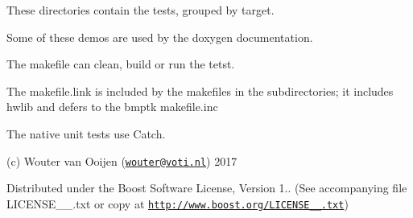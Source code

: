 These directories contain the tests, grouped by target.

Some of these demos are used by the doxygen documentation.

The makefile can clean, build or run the tetst.

The makefile.\+link is included by the makefiles in the subdirectories; it includes hwlib and defers to the bmptk makefile.\+inc

The native unit tests use Catch.

(c) Wouter van Ooijen (\href{mailto:wouter@voti.nl}{\tt wouter@voti.\+nl}) 2017

Distributed under the Boost Software License, Version 1.. (See accompanying file L\+I\+C\+E\+N\+S\+E\+\_\+\_.\+txt or copy at \href{http://www.boost.org/LICENSE_1_0.txt}{\tt http\+://www.\+boost.\+org/\+L\+I\+C\+E\+N\+S\+E\+\_\+\_.\+txt}) 